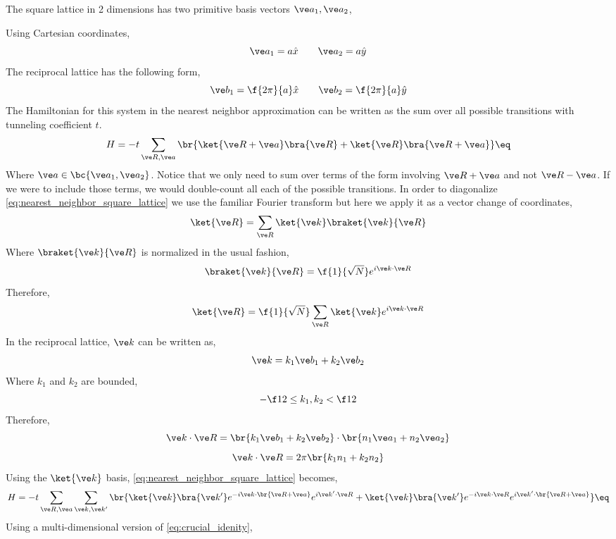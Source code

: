 \documentclass{article}
\begin{document}
The square lattice in 2 dimensions has two primitive basis vectors $\ve a_{1}, \ve a_{2}$,
\begin{center}
\end{center}
Using Cartesian coordinates,
\[ \ve a_1 = a \hat x \qquad \ve a_2 = a \hat y \]
The reciprocal lattice has the following form,
\[ \ve b_1 = \f{2 \pi }{a}\hat x \qquad \ve b_2 = \f{2 \pi}{a} \hat y \]
The Hamiltonian for this system in the nearest neighbor approximation can be written as the sum over all possible transitions with tunneling coefficient $t$.
\[ H = - t \sum_{\ve R, \ve a} \br{\ket{\ve R + \ve a} \bra{\ve R} + \ket{\ve R} \bra{\ve R + \ve a}} \eq \label{eq:nearest_neighbor_square_lattice} \]
Where $\ve a \in \bc{\ve a_1, \ve a_2}$. Notice that we only need to sum over terms of the form involving $\ve R + \ve a$ and not $\ve R - \ve a$. If we were to include those terms, we would double-count all each of the possible transitions. In order to diagonalize \cref{eq:nearest_neighbor_square_lattice} we use the familiar Fourier transform but here we apply it as a vector change of coordinates,
\[\ket{\ve R} = \sum_{\ve R} \ket{\ve k} \braket{\ve k}{\ve R} \]
Where $\braket{\ve k}{\ve R}$ is normalized in the usual fashion,
\[ \braket{\ve k}{\ve R} = \f{1}{\sqrt{N}} e^{i \ve k \cdot \ve R} \]
Therefore,
\[\ket{\ve R} = \f{1}{\sqrt{N}} \sum_{\ve R} \ket{\ve k}  e^{i \ve k \cdot \ve R} \]
In the reciprocal lattice, $\ve k$ can be written as,
\[ \ve k = k_1 \ve b_1 + k_2 \ve b_2 \]
Where $k_{1}$ and $k_{2}$ are bounded,
\[ -\f12 \leq k_{1}, k_{2} < \f12 \]
Therefore,
\[ \ve k \cdot \ve R = \br{k_1 \ve b_1 + k_2 \ve b_2} \cdot \br{n_1 \ve a_1 + n_2 \ve a_2} \]
\[ \ve k \cdot \ve R = 2 \pi \br{k_1 n_1 + k_2 n_2} \]
Using the $\ket{\ve k}$ basis, \cref{eq:nearest_neighbor_square_lattice} becomes,
\[ H = - t \sum_{\ve R, \ve a} \sum_{\ve k, \ve k'} \br{\ket{\ve k}\bra{\ve k'} e^{-i \ve k \cdot \br{\ve R + \ve a}} e^{i \ve k' \cdot \ve R} + \ket{\ve k}\bra{\ve k'} e^{-i \ve k \cdot \ve R} e^{i \ve k' \cdot \br{\ve R + \ve a}}} \eq \label{eq:nearest_neighbor_square_lattice_momentum} \]
Using a multi-dimensional version of \cref{eq:crucial_idenity},
\end{document}
